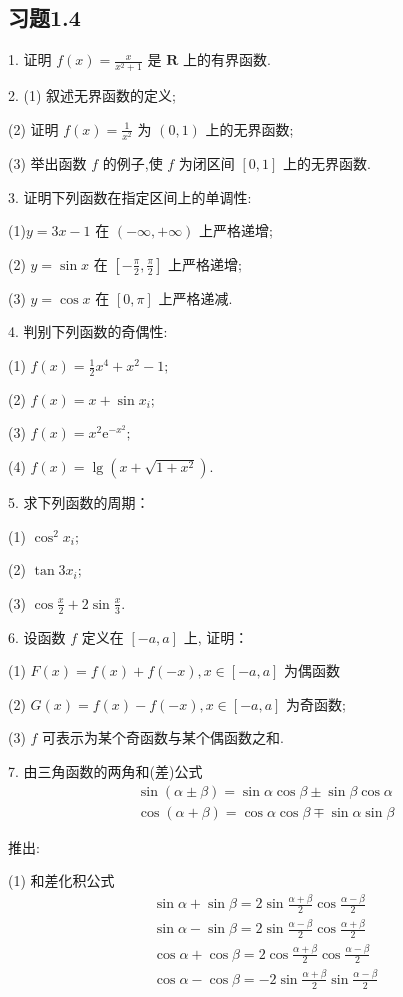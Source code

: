 \subsection{习题1.4}
1. 证明 $f(x)=\frac{x}{x^{2}+1}$ 是 $\mathbf{R}$ 上的有界函数.

2. (1) 叙述无界函数的定义;

(2) 证明 $f(x)=\frac{1}{x^{2}}$ 为 $(0,1)$ 上的无界函数;

(3) 举出函数 $f$ 的例子,使 $f$ 为闭区间 $[0,1]$ 上的无界函数.

3. 证明下列函数在指定区间上的单调性:

(1)$ y=3 x-1 $ 在 $(-\infty,+\infty) $ 上严格递增;

(2) $y=\sin x$ 在 $\left[-\frac{\pi}{2}, \frac{\pi}{2}\right]$ 上严格递增;

(3) $y=\cos x$ 在 $[0, \pi]$ 上严格递减.

4. 判别下列函数的奇偶性:

(1) $ f(x)=\frac{1}{2} x^{4}+x^{2}-1 ; $

(2) $ f(x)=x+\sin x_{i};$

(3) $f(x)=x^{2} \mathrm{e}^{-x^{2}};$

(4) $ f(x)=\lg \left(x+\sqrt{1+x^{2}}\right) .$


5. 求下列函数的周期：

(1) $ \cos ^{2} x_{i} ;$

(2) $ \tan 3 x_{i} ;$

(3) $ \cos \frac{x}{2}+2 \sin \frac{x}{3} .$


6. 设函数 $f$ 定义在 $[-a, a]$ 上, 证明：

(1) $F(x)=f(x)+f(-x), x \in[-a, a]$ 为偶函数

(2) $G(x)=f(x)-f(-x), x \in[-a, a]$ 为奇函数;

(3) $f$ 可表示为某个奇函数与某个偶函数之和.

7. 由三角函数的两角和(差)公式
\[
\begin{aligned}
	&\sin (\alpha \pm \beta)=\sin \alpha \cos \beta \pm \sin \beta \cos \alpha \\
	&\cos (\alpha+\beta)=\cos \alpha \cos \beta \mp \sin \alpha \sin \beta
\end{aligned}
\]

推出:

(1) 和差化积公式
\[
\begin{aligned}
	&\sin \alpha+\sin \beta=2 \sin \frac{\alpha+\beta}{2} \cos \frac{\alpha-\beta}{2} \\
	&\sin \alpha-\sin \beta=2 \sin \frac{\alpha-\beta}{2} \cos \frac{\alpha+\beta}{2} \\
	&\cos \alpha+\cos \beta=2 \cos \frac{\alpha+\beta}{2} \cos \frac{\alpha-\beta}{2} \\
	&\cos \alpha-\cos \beta=-2 \sin \frac{\alpha+\beta}{2} \sin \frac{\alpha-\beta}{2}
\end{aligned}
\]

